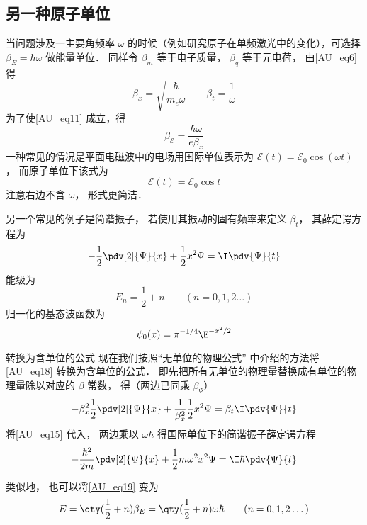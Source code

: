 \subsection{另一种原子单位}

当问题涉及一主要角频率 $\omega$ 的时候（例如研究原子在单频激光中的变化），可选择 $\beta_E = \hbar\omega$ 做能量单位． 同样令 $\beta_m$ 等于电子质量， $\beta_q$ 等于元电荷， 由\autoref{AU_eq6} 得
\begin{equation}\label{AU_eq15}
\beta_x = \sqrt{\frac{\hbar}{m_e\omega}}
\qquad
\beta_t = \frac{1}{\omega}
\end{equation}
为了使\autoref{AU_eq11} 成立，得
\begin{equation}
\beta_\mathcal{E} = \frac{\hbar\omega}{e \beta_x}
\end{equation}
一种常见的情况是平面电磁波中的电场用国际单位表示为 $\mathcal{E}(t) = \mathcal{E}_0\cos(\omega t)$， 而原子单位下该式为
\begin{equation}
\mathcal{E}(t) = \mathcal{E}_0\cos t
\end{equation}
注意右边不含 $\omega$， 形式更简洁．

另一个常见的例子是简谐振子， 若使用其振动的固有频率来定义 $\beta_t$， 其薛定谔方程为
\begin{equation}\label{AU_eq18}
-\frac12 \pdv[2]{\Psi}{x} + \frac12 x^2 \Psi= \I\pdv{\Psi}{t}
\end{equation}
能级为
\begin{equation}\label{AU_eq19}
E_n = \frac12 + n \qquad (n = 0, 1, 2\dots)
\end{equation}
归一化的基态波函数为
\begin{equation}
\psi_0(x) = \pi^{-1/4} \E^{-x^2/2}
\end{equation}


\begin{example}{转换为含单位的公式}
现在我们按照“无单位的物理公式” 中介绍的方法将\autoref{AU_eq18} 转换为含单位的公式． 即先把所有无单位的物理量替换成有单位的物理量除以对应的 $\beta$ 常数， 得（两边已同乘 $\beta_\Psi$）
\begin{equation}
-\beta_x^2\frac12 \pdv[2]{\Psi}{x} + \frac{1}{\beta_x^2}\frac12 x^2 \Psi= \beta_t\I\pdv{\Psi}{t}
\end{equation}
将\autoref{AU_eq15} 代入， 两边乘以 $\omega\hbar$ 得国际单位下的简谐振子薛定谔方程
\begin{equation}
-\frac{\hbar^2}{2m} \pdv[2]{\Psi}{x} + \frac12 m\omega^2 x^2 \Psi= \I\hbar\pdv{\Psi}{t}
\end{equation}

类似地， 也可以将\autoref{AU_eq19} 变为
\begin{equation}
E =  \qty(\frac12 + n)\beta_E = \qty(\frac12 + n)\omega\hbar \qquad (n = 0, 1, 2\dots)
\end{equation}
\end{example}
